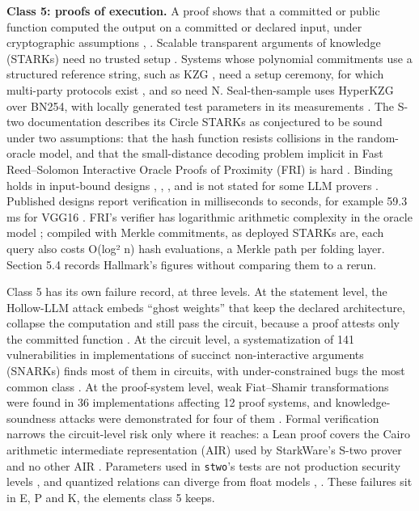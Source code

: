 \documentclass[11pt]{article}
\begin{document}
\textbf{Class 5: proofs of execution.} A proof shows that a committed or public function computed the output on a committed or declared input, under cryptographic assumptions \cite{A7}, \cite{A32}. Scalable transparent arguments of knowledge (STARKs) need no trusted setup \cite{A24}. Systems whose polynomial commitments use a structured reference string, such as KZG \cite{A41}, need a setup ceremony, for which multi-party protocols exist \cite{A42}, and so need N. Seal-then-sample uses HyperKZG over BN254, with locally generated test parameters in its measurements \cite{A22}. The S-two documentation describes its Circle STARKs as conjectured to be sound under two assumptions: that the hash function resists collisions in the random-oracle model, and that the small-distance decoding problem implicit in Fast Reed--Solomon Interactive Oracle Proofs of Proximity (FRI) is hard \cite{A28}. Binding holds in input-bound designs \cite{A5}, \cite{A12}, \cite{A17}, \cite{A22} and is not stated for some LLM provers \cite{A15}. Published designs report verification in milliseconds to seconds, for example 59.3 ms for VGG16 \cite{A5}. FRI's verifier has logarithmic arithmetic complexity in the oracle model \cite{A25}; compiled with Merkle commitments, as deployed STARKs are, each query also costs O(log² n) hash evaluations, a Merkle path per folding layer. Section 5.4 records Hallmark's figures without comparing them to a rerun.

Class 5 has its own failure record, at three levels. At the statement level, the Hollow-LLM attack embeds ``ghost weights'' that keep the declared architecture, collapse the computation and still pass the circuit, because a proof attests only the committed function \cite{A23}. At the circuit level, a systematization of 141 vulnerabilities in implementations of succinct non-interactive arguments (SNARKs) finds most of them in circuits, with under-constrained bugs the most common class \cite{F1}. At the proof-system level, weak Fiat--Shamir transformations were found in 36 implementations affecting 12 proof systems, and knowledge-soundness attacks were demonstrated for four of them \cite{F2}. Formal verification narrows the circuit-level risk only where it reaches: a Lean proof covers the Cairo arithmetic intermediate representation (AIR) used by StarkWare's S-two prover and no other AIR \cite{A30}. Parameters used in \texttt{stwo}'s tests are not production security levels \cite{A28}, and quantized relations can diverge from float models \cite{A10}, \cite{A22}. These failures sit in E, P and K, the elements class 5 keeps.
\end{document}

